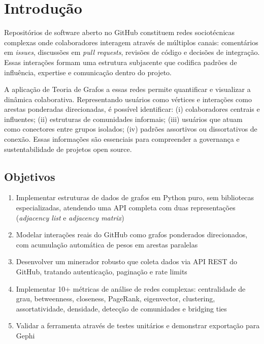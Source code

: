 \documentclass[12pt,a4paper]{article}
\begin{document}
\newpage

\thispagestyle{empty}
\tableofcontents
\newpage

\setcounter{page}{1}



\section{Introdução}\label{sec:intro}

Repositórios de software aberto no GitHub constituem redes sociotécnicas complexas onde colaboradores interagem através de múltiplos canais: comentários em \textit{issues}, discussões em \textit{pull requests}, revisões de código e decisões de integração. Essas interações formam uma estrutura subjacente que codifica padrões de influência, expertise e comunicação dentro do projeto.

A aplicação de Teoria de Grafos a essas redes permite quantificar e visualizar a dinâmica colaborativa. Representando usuários como vértices e interações como arestas ponderadas direcionadas, é possível identificar: (i) colaboradores centrais e influentes; (ii) estruturas de comunidades informais; (iii) usuários que atuam como conectores entre grupos isolados; (iv) padrões assortivos ou dissortativos de conexão. Essas informações são essenciais para compreender a governança e sustentabilidade de projetos open source.

\subsection{Objetivos}

\begin{enumerate}
  \item Implementar estruturas de dados de grafos em Python puro, sem bibliotecas especializadas, atendendo uma API completa com duas representações (\textit{adjacency list} e \textit{adjacency matrix})
  \item Modelar interações reais do GitHub como grafos ponderados direcionados, com acumulação automática de pesos em arestas paralelas
  \item Desenvolver um minerador robusto que coleta dados via API REST do GitHub, tratando autenticação, paginação e rate limits
  \item Implementar 10+ métricas de análise de redes complexas: centralidade de grau, betweenness, closeness, PageRank, eigenvector, clustering, assortatividade, densidade, detecção de comunidades e bridging ties
  \item Validar a ferramenta através de testes unitários e demonstrar exportação para Gephi
\end{enumerate}
\end{document}
